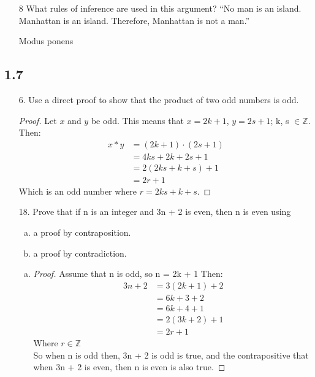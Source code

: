 \begin{itemize}
    \item[8] What rules of inference are used in this argument? “No man is an island. Manhattan is an island. Therefore, Manhattan is not a man.”

          \answer Modus ponens
\end{itemize}

\subsection{1.7}
\begin{itemize}
    \item[6.] Use a direct proof to show that the product of two odd numbers is odd.
          \begin{proof}
              Let $x$ and $y$ be odd. This means that $x = 2k + 1$, $y = 2s + 1$; k, s $\in\mathbb{Z}$. \\
              Then:
              \begin{align*}
                  x*y & = (2k + 1) \cdot (2s+1) \\
                      & = 4ks + 2k + 2s + 1     \\
                      & = 2(2ks + k + s) + 1    \\
                      & = 2r + 1
              \end{align*}
              Which is an odd number where $r = 2ks + k + s$.
          \end{proof}

    \item[18.] Prove that if n is an integer and 3n + 2 is even, then n is even using
          \begin{enumerate}[a.]
              \item a proof by contraposition.
              \item a proof by contradiction.
          \end{enumerate}
          \begin{enumerate}[a.]
              \item
                    \begin{proof}
                        Assume that n is odd, so n = 2k  + 1
                        Then:
                        \begin{align*}
                            3n + 2 & = 3(2k + 1)  + 2 \\
                                   & = 6k + 3 + 2     \\
                                   & = 6k + 4 + 1     \\
                                   & = 2(3k + 2) + 1  \\
                                   & = 2r + 1
                        \end{align*}
                        Where $r \in \mathbb{Z}$\\
                        So when n is odd then, 3n + 2 is odd is true, and the contrapositive that when 3n + 2 is even, then n is even is also true.
                    \end{proof}


\end{enumerate}
\end{itemize}
